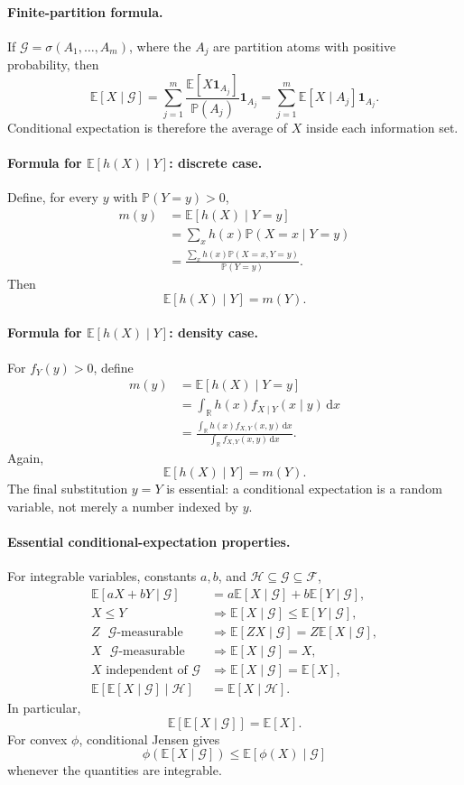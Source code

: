 \documentclass[11pt]{article}
\newcommand{\R}{\mathbb{R}}
\newcommand{\F}{\mathcal{F}}
\newcommand{\Pbb}{\mathbb{P}}
\newcommand{\E}{\mathbb{E}}
\newcommand{\dd}{\,\mathrm{d}}
\newcommand{\1}{\mathbf{1}}
\theoremstyle{plain}
\theoremstyle{definition}
\theoremstyle{remark}
\begin{document}
\paragraph{Finite-partition formula.}
If $\mathcal G=\sigma(A_1,\ldots,A_m)$, where the $A_j$ are partition atoms
with positive probability, then
\[
\E[X\mid\mathcal G]
=\sum_{j=1}^m
\frac{\E[X\1_{A_j}]}{\Pbb(A_j)}\1_{A_j}
=\sum_{j=1}^m\E[X\mid A_j]\1_{A_j}.
\]
Conditional expectation is therefore the average of $X$ inside each
information set.

\paragraph{Formula for $\E[h(X)\mid Y]$: discrete case.}
Define, for every $y$ with $\Pbb(Y=y)>0$,
\begin{align*}
m(y)
&=\E[h(X)\mid Y=y]\\
&=\sum_xh(x)\Pbb(X=x\mid Y=y)\\
&=\frac{\sum_xh(x)\Pbb(X=x,Y=y)}{\Pbb(Y=y)}.
\end{align*}
Then
\[
\boxed{\E[h(X)\mid Y]=m(Y).}
\]

\paragraph{Formula for $\E[h(X)\mid Y]$: density case.}
For $f_Y(y)>0$, define
\begin{align*}
m(y)
&=\E[h(X)\mid Y=y]\\
&=\int_{\R}h(x)f_{X\mid Y}(x\mid y)\dd x\\
&=\frac{\int_{\R}h(x)f_{X,Y}(x,y)\dd x}
        {\int_{\R}f_{X,Y}(x,y)\dd x}.
\end{align*}
Again,
\[
\boxed{\E[h(X)\mid Y]=m(Y).}
\]
The final substitution $y=Y$ is essential: a conditional expectation is a
random variable, not merely a number indexed by $y$.

\paragraph{Essential conditional-expectation properties.}
For integrable variables, constants $a,b$, and
$\mathcal H\subseteq\mathcal G\subseteq\F$,
\begin{align*}
\E[aX+bY\mid\mathcal G]
&=a\E[X\mid\mathcal G]+b\E[Y\mid\mathcal G],\\
X\le Y
&\Longrightarrow
\E[X\mid\mathcal G]\le\E[Y\mid\mathcal G],\\
Z\text{ $\mathcal G$-measurable}
&\Longrightarrow
\E[ZX\mid\mathcal G]=Z\E[X\mid\mathcal G],\\
X\text{ $\mathcal G$-measurable}
&\Longrightarrow
\E[X\mid\mathcal G]=X,\\
X\text{ independent of }\mathcal G
&\Longrightarrow
\E[X\mid\mathcal G]=\E[X],\\
\E[\E[X\mid\mathcal G]\mid\mathcal H]
&=\E[X\mid\mathcal H].
\end{align*}
In particular,
\[
\E[\E[X\mid\mathcal G]]=\E[X].
\]
For convex $\phi$, conditional Jensen gives
\[
\phi(\E[X\mid\mathcal G])
\le\E[\phi(X)\mid\mathcal G]
\]
whenever the quantities are integrable.
\end{document}
